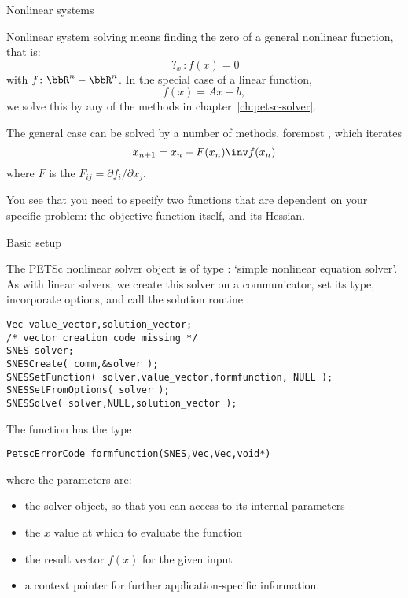 
 {Nonlinear systems}

Nonlinear system solving means finding the zero of a general nonlinear function,
that is:
\[ \mathop{?}_x\colon f(x)=0 \]
with $f\colon \bbR^n-\bbR^n$.
In the special case of a linear function,
\[ f(x) = Ax-b, \]
we solve this by any of the methods in chapter~\ref{ch:petsc-solver}.

The general case can be solved by a number of methods,
foremost ,
which iterates
\[ x_{n+1} = x_n - F(x_n)\inv f(x_n) \]
where $F$ is the  $F_{ij}=\partial f_i/\partial x_j$.

You see that you need to specify two functions
that are dependent on your specific problem:
the objective function itself, and its Hessian.

 {Basic setup}

The PETSc nonlinear solver object is of type :
`simple nonlinear equation solver'.
As with linear solvers, we create this solver on a communicator,
set its type, incorporate options,
and call the solution routine :

\begin{lstlisting}
Vec value_vector,solution_vector;
/* vector creation code missing */
SNES solver;
SNESCreate( comm,&solver );
SNESSetFunction( solver,value_vector,formfunction, NULL );
SNESSetFromOptions( solver );
SNESSolve( solver,NULL,solution_vector );
\end{lstlisting}

The function has the type
\begin{lstlisting}
PetscErrorCode formfunction(SNES,Vec,Vec,void*)
\end{lstlisting}
where the parameters are:
\begin{itemize}
\item the solver object, so that you can access to its internal parameters
\item the $x$ value at which to evaluate the function
\item the result vector $f(x)$ for the given input
\item a context pointer for further application-specific information.
\end{itemize}


